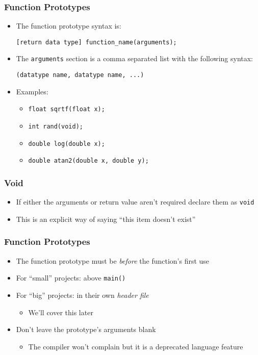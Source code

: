 \documentclass[14pt]{beamer}
\begin{document}
\begin{frame}[fragile]
\frametitle{Function Prototypes}
\begin{itemize}
\item The function prototype syntax is:
\begin{lstlisting}[style=CStyle]
[return data type] function_name(arguments);
\end{lstlisting}
\pause
\item The \texttt{arguments} section is a comma separated list with the following syntax:
\begin{lstlisting}[style=CStyle]
(datatype name, datatype name, ...)
\end{lstlisting}
\item Examples:
	\begin{itemize}
		\item \texttt{float sqrtf(float x);}
		\item \texttt{int rand(void);}
		\item \texttt{double log(double x);}
		\item \texttt{double atan2(double x, double y);}
	\end{itemize}
\end{itemize}
\end{frame}

\begin{frame}
\frametitle{Void}
\begin{itemize}
\item If either the arguments or return value aren't required declare them as \texttt{void}
\item This is an explicit way of saying ``this item doesn't exist'' 
\end{itemize}
\end{frame}

\begin{frame}
\frametitle{Function Prototypes}
\begin{itemize}
\item The function prototype must be \textit{before} the function's first use
\item For ``small'' projects: above \texttt{main()}
\item For ``big'' projects: in their own \textit{header file}
	\begin{itemize}
		\item We'll cover this later
	\end{itemize}
\item Don't leave the prototype's arguments blank
	\begin{itemize}
		\item The compiler won't complain but it is a deprecated language feature
	\end{itemize}
\end{itemize}
\end{frame}
\end{document}
